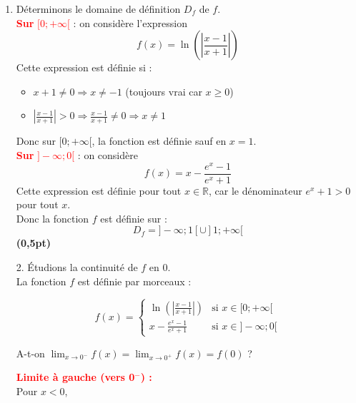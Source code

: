 \documentclass[12pt,a4paper]{article}
\begin{document}
\begin{enumerate}
    \item Déterminons le domaine de définition \( D_f \) de \( f \).\\

          \textcolor{red}{\textbf{Sur } \( [0 ; +\infty[ \)} : on considère l’expression
          \[
              f(x) = \ln\left( \left| \frac{x - 1}{x + 1} \right| \right)
          \]
          Cette expression est définie si :
          \begin{itemize}
              \item \( x + 1 \neq 0 \Rightarrow x \neq -1 \) (toujours vrai car \( x \geq 0 \))
              \item \( \left| \frac{x - 1}{x + 1} \right| > 0 \Rightarrow \frac{x - 1}{x + 1} \neq 0 \Rightarrow x \neq 1 \)
          \end{itemize}
          Donc sur \( [0 ; +\infty[ \), la fonction est définie sauf en \( x = 1 \).\\

          \textcolor{red}{\textbf{Sur } \( ]-\infty ; 0[ \)} : on considère
                  \[
                      f(x) = x-\frac{e^x - 1}{e^x + 1}
                  \]
                  Cette expression est définie pour tout \( x \in \mathbb{R} \), car le dénominateur \( e^x + 1 > 0 \) pour tout \( x \).\\

                  Donc la fonction \( f \) est définie sur :
                  \[
                  D_f = ]-\infty ; 1[ \cup ]1 ; +\infty[
          \]
          \hfill \textbf{(0,5pt)}

    \item[2.] Étudions la continuité de \( f \) en 0.\\

        La fonction \( f \) est définie par morceaux :

        \[
            f(x) =
            \begin{cases}
                \ln\left( \left| \frac{x - 1}{x + 1} \right| \right) & \text{si } x \in [0 ; +\infty[ \\
                x-\frac{e^x - 1}{e^x + 1}                            & \text{si } x \in ]-\infty ; 0[
            \end{cases}
        \]

        A-t-on \( \displaystyle \lim_{x \to 0^-} f(x) = \lim_{x \to 0^+} f(x) = f(0) \) ?

        \textcolor{red}{\textbf{Limite à gauche (vers 0\(^-\)) :}}\\
        Pour \( x < 0 \),


\end{enumerate}
\end{document}
